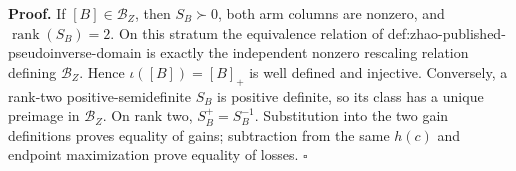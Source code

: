 \textbf{Proof.}
If \([B]\in\mathcal B_Z\), then \(S_B\succ0\), both arm columns are nonzero, and \(\operatorname{rank}(S_B)=2\).  On this stratum the equivalence relation of def:zhao-published-pseudoinverse-domain is exactly the independent nonzero rescaling relation defining \(\mathcal B_Z\).  Hence \(\iota([B])=[B]_+\) is well defined and injective.  Conversely, a rank-two positive-semidefinite \(S_B\) is positive definite, so its class has a unique preimage in \(\mathcal B_Z\).  On rank two, \(S_B^+=S_B^{-1}\).  Substitution into the two gain definitions proves equality of gains; subtraction from the same \(h(c)\) and endpoint maximization prove equality of losses. \(\square\)